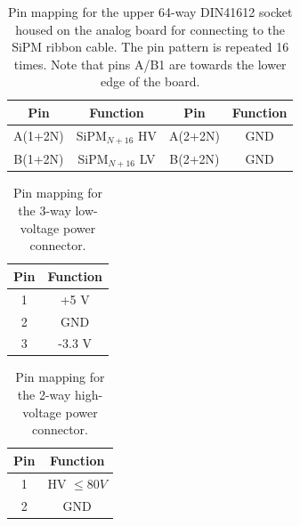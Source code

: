 \documentclass[a4paper]{article}
\begin{document}
\begin{table}[h]
    \begin{center}
        \caption{Pin mapping for the upper 64-way DIN41612 socket housed on the analog board for connecting to the SiPM ribbon cable. The pin pattern is repeated 16 times. Note that pins A/B1 are towards the lower edge of the board.}
        \label{tab:upperIDC64way}
        \begin{tabular}{cc|cc}
            \hline
            \hline
            Pin & Function & Pin & Function \\
            \hline
            A(1+2N) & SiPM$_{N+16}$ HV & A(2+2N) & GND \\
            B(1+2N) & SiPM$_{N+16}$ LV & B(2+2N) & GND \\
            \hline
            \hline
        \end{tabular}
    \end{center}
\end{table}

\begin{table}[h]
    \begin{center}
        \caption{Pin mapping for the 3-way low-voltage power connector.}
        \label{tab:LVPower}
        \begin{tabular}{cc}
            \hline
            \hline
            Pin & Function \\
            \hline
            1 & +5 V \\
            2 & GND \\
            3 & -3.3 V \\
            \hline
            \hline
        \end{tabular}
    \end{center}
\end{table}

\begin{table}[h]
    \begin{center}
        \caption{Pin mapping for the 2-way high-voltage power connector.}
        \label{tab:HVPower}
        \begin{tabular}{cc}
            \hline
            \hline
            Pin & Function \\
            \hline
            1 & HV $\le 80 V$ \\
            2 & GND \\
            \hline
            \hline
        \end{tabular}
    \end{center}
\end{table}
\end{document}
